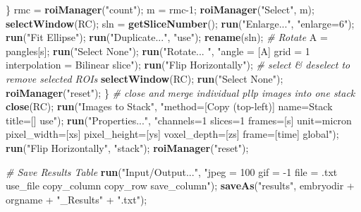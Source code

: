 \documentclass[11pt,singlespacinge,twoside]{reedthesis} %
\newenvironment{Shaded}{}{}
\newcommand{\CommentTok}[1]{\textit{#1}}
\newcommand{\DecValTok}[1]{#1}
\newcommand{\KeywordTok}[1]{\textbf{#1}}
\newcommand{\NormalTok}[1]{#1}
\newcommand{\OperatorTok}[1]{#1}
\newcommand{\StringTok}[1]{#1}
\theoremstyle{definition}
\theoremstyle{definition}
\theoremstyle{definition}
\theoremstyle{remark}
\begin{document}
\begin{Shaded}
\begin{Highlighting}[numbers=left,,]
\NormalTok{                \}}
\NormalTok{                rmc =}\StringTok{ }\KeywordTok{roiManager}\NormalTok{(}\StringTok{"count"}\NormalTok{);}
\NormalTok{                m =}\StringTok{ }\NormalTok{rmc}\DecValTok{-1}\NormalTok{;}
                \KeywordTok{roiManager}\NormalTok{(}\StringTok{"Select"}\NormalTok{, m);}
                \KeywordTok{selectWindow}\NormalTok{(RC);}
\NormalTok{                sln =}\StringTok{ }\KeywordTok{getSliceNumber}\NormalTok{();}
                \KeywordTok{run}\NormalTok{(}\StringTok{"Enlarge..."}\NormalTok{, }\StringTok{"enlarge=6"}\NormalTok{);}
                \KeywordTok{run}\NormalTok{(}\StringTok{"Fit Ellipse"}\NormalTok{);}
                \KeywordTok{run}\NormalTok{(}\StringTok{"Duplicate..."}\NormalTok{, }\StringTok{"use"}\NormalTok{);}
                \KeywordTok{rename}\NormalTok{(sln);}
            \CommentTok{#   Rotate}
\NormalTok{                A =}\StringTok{ }\NormalTok{pangles[s];}
                \KeywordTok{run}\NormalTok{(}\StringTok{"Select None"}\NormalTok{);}
                \KeywordTok{run}\NormalTok{(}\StringTok{"Rotate... "}\NormalTok{, }\StringTok{"angle = [A] grid = 1 interpolation = Bilinear slice"}\NormalTok{);}
                \KeywordTok{run}\NormalTok{(}\StringTok{"Flip Horizontally"}\NormalTok{);}
            \CommentTok{# select & deselect to remove selected ROIs}
                \KeywordTok{selectWindow}\NormalTok{(RC);}
                \KeywordTok{run}\NormalTok{(}\StringTok{"Select None"}\NormalTok{);}
                \KeywordTok{roiManager}\NormalTok{(}\StringTok{"reset"}\NormalTok{);}
\NormalTok{            \}}
        \CommentTok{#   close and merge individual pllp images into one stack}
            \KeywordTok{close}\NormalTok{(RC);}
            \KeywordTok{run}\NormalTok{(}\StringTok{"Images to Stack"}\NormalTok{, }\StringTok{"method=[Copy (top-left)] name=Stack title=[] use"}\NormalTok{);}
            \KeywordTok{run}\NormalTok{(}\StringTok{"Properties..."}\NormalTok{, }\StringTok{"channels=1 slices=1 frames=[s] unit=micron}
\StringTok{                pixel_width=[xs] pixel_height=[ys] voxel_depth=[zs] frame=[time] global"}\NormalTok{);  }
            \KeywordTok{run}\NormalTok{(}\StringTok{"Flip Horizontally"}\NormalTok{, }\StringTok{"stack"}\NormalTok{);}
            \KeywordTok{roiManager}\NormalTok{(}\StringTok{"reset"}\NormalTok{);}
                
     \CommentTok{#  Save Results Table}
      \KeywordTok{run}\NormalTok{(}\StringTok{"Input/Output..."}\NormalTok{, }\StringTok{"jpeg = 100 gif = -1 file = .txt use_file copy_column copy_row save_column"}\NormalTok{);}
            \KeywordTok{saveAs}\NormalTok{(}\StringTok{"results"}\NormalTok{, embryodir }\OperatorTok{+}\StringTok{ }\NormalTok{orgname }\OperatorTok{+}\StringTok{ "_Results"} \OperatorTok{+}\StringTok{ ".txt"}\NormalTok{);}
\end{Highlighting}
\end{Shaded}
\normalsize
\end{document}
